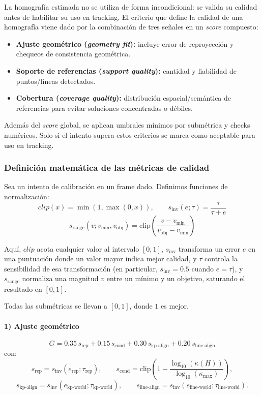 La homografía estimada no se utiliza de forma incondicional: se valida su calidad antes de habilitar su uso en tracking. El criterio que define la calidad de una homografía viene dado por la combinación de tres señales en un \textit{score} compuesto:
\begin{itemize}
    \item \textbf{Ajuste geométrico (\textit{geometry fit}):} incluye error de reproyección y chequeos de consistencia geométrica.
    \item \textbf{Soporte de referencias (\textit{support quality}):} cantidad y fiabilidad de puntos/líneas detectados.
    \item \textbf{Cobertura (\textit{coverage quality}):} distribución espacial/semántica de referencias para evitar soluciones concentradas o débiles.
\end{itemize}

Además del \textit{score} global, se aplican umbrales mínimos por submétrica y checks numéricos. Solo si el intento supera estos criterios se marca como aceptable para uso en tracking.

\subsubsection{Definición matemática de las métricas de calidad}

Sea un intento de calibración en un frame dado. Definimos funciones de normalización:
\[
clip(x)=\min(1,\max(0,x)),
\qquad
s_{\text{inv}}(e;\tau)=\frac{\tau}{\tau+e}
\]
\[
s_{\text{range}}(v;v_{\min},v_{\text{obj}})=
\mathrm{clip}\!\left(\frac{v-v_{\min}}{v_{\text{obj}}-v_{\min}}\right)
\]

Aquí, \({clip}\) acota cualquier valor al intervalo \([0,1]\), 
\(s_{\text{inv}}\) transforma un error \(e\) en una puntuación donde un valor mayor indica mejor calidad, y \(\tau\) controla la sensibilidad de esa transformación (en particular, \(s_{\text{inv}}=0.5\) cuando \(e=\tau\)), y \(s_{\text{range}}\) normaliza una magnitud \(v\) entre un mínimo y un objetivo, saturando el resultado en \([0,1]\).


Todas las submétricas se llevan a \([0,1]\), donde \(1\) es mejor.

\paragraph{1) Ajuste geométrico}
\[
G = 0.35\,s_{\text{rep}} + 0.15\,s_{\text{cond}} + 0.30\,s_{\text{kp-align}} + 0.20\,s_{\text{line-align}}
\]
con:
\[
s_{\text{rep}} = s_{\text{inv}}(e_{\text{rep}};\tau_{\text{rep}}),
\qquad
s_{\text{cond}}=
\mathrm{clip}\!\left(
1-\frac{\log_{10}(\kappa(H))}{\log_{10}(\kappa_{\max})}
\right),
\]
\[
s_{\text{kp-align}} = s_{\text{inv}}(e_{\text{kp-world}};\tau_{\text{kp-world}}),
\qquad
s_{\text{line-align}} = s_{\text{inv}}(e_{\text{line-world}};\tau_{\text{line-world}}).
\]

